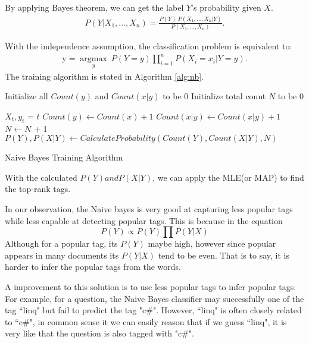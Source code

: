 By applying Bayes theorem, we can get the label $Y$'s probability given $X$.
\begin{gather}
    P(Y \vert X_1,\dots,X_n) = \frac{P(Y) \ P(X_1,\dots,X_n\vert Y)}{P(X_1,\dots,X_n)}. 
\end{gather}

With the independence assumption, the classification problem is equivalent to:
\begin{gather}
    \mathrm{y} = \underset{y}{\operatorname{argmax}} \ P(Y=y) \displaystyle\prod_{i=1}^n P(X_i=x_i\vert Y=y).
\end{gather}
The training algorithm is stated in Algorithm \ref{alg:nb}.

\IncMargin{1em}
\begin{algorithm}
\label{alg:nb}
\BlankLine
Initialize all $Count(y)$ and $Count(x|y)$ to be 0\;
Initialize total count $N$ to be 0\;

 {
    $X_t, y_t$ = $t$\;
     {
        $Count(y) \leftarrow Count(x) + 1$ \;
        $Count(x|y) \leftarrow Count(x|y) + 1$ \;
        $N \leftarrow N$ + 1 \;
    }
}
\Return $P(Y), P(X|Y) \leftarrow CalculateProbability(Count(Y), Count(X|Y), N)$

\caption{Naive Bayes Training Algorithm}\label{algo_disjdecomp}
\end{algorithm}
\DecMargin{1em}

With the calculated $P(Y) and P(X|Y)$, we can apply the MLE(or MAP) to find the top-rank tags.

In our observation, the Naive bayes is very good at capturing less popular tags while less capable at detecting popular tags. This is because in the equation
    $$ P(Y) \propto P(Y) \prod P(Y | X) $$
Although for a popular tag, its $P(Y)$ maybe high, however since popular appears in many documents its $P(Y|X)$ tend to be even. That is to say, it is harder to infer the popular tags from the words.

A improvement to this solution is to use less popular tags to infer popular tags. For example, for a question, the Naive Bayes classifier may successfully one of the tag ``linq" but fail to predict the tag "c\#". However, ``linq" is often closely related to ``c\#", in common sense it we can easily reason that if we guess ``linq", it is very like that the question is also tagged with "c\#".

